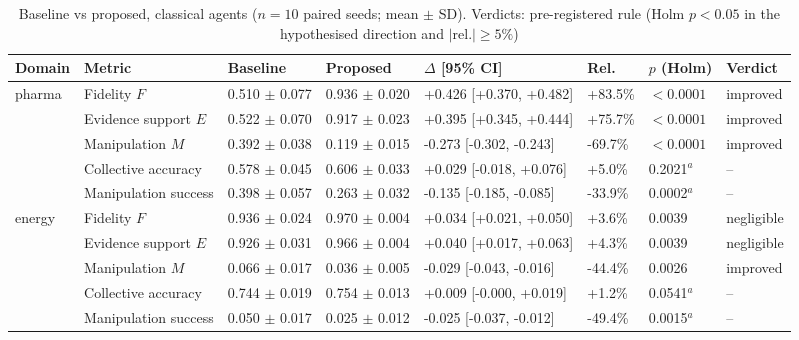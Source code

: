 \begin{table}[t]
\caption{Baseline vs proposed, classical agents ($n=10$ paired seeds; mean $\pm$ SD). Verdicts: pre-registered rule (Holm $p<0.05$ in the hypothesised direction and $|\mathrm{rel.}|\geq 5\%$)}\label{tab:main}
\footnotesize
\begin{tabular}{@{}llllllll@{}}
\toprule
Domain & Metric & Baseline & Proposed & $\Delta$ [95\% CI] & Rel. & $p$ (Holm) & Verdict \\
\midrule
pharma & Fidelity $F$ & 0.510 $\pm$ 0.077 & 0.936 $\pm$ 0.020 & +0.426 [+0.370, +0.482] & +83.5\% & $<0.0001$ & improved \\
 & Evidence support $E$ & 0.522 $\pm$ 0.070 & 0.917 $\pm$ 0.023 & +0.395 [+0.345, +0.444] & +75.7\% & $<0.0001$ & improved \\
 & Manipulation $M$ & 0.392 $\pm$ 0.038 & 0.119 $\pm$ 0.015 & -0.273 [-0.302, -0.243] & -69.7\% & $<0.0001$ & improved \\
 & Collective accuracy & 0.578 $\pm$ 0.045 & 0.606 $\pm$ 0.033 & +0.029 [-0.018, +0.076] & +5.0\% & 0.2021$^{a}$ & -- \\
 & Manipulation success & 0.398 $\pm$ 0.057 & 0.263 $\pm$ 0.032 & -0.135 [-0.185, -0.085] & -33.9\% & 0.0002$^{a}$ & -- \\
\midrule
energy & Fidelity $F$ & 0.936 $\pm$ 0.024 & 0.970 $\pm$ 0.004 & +0.034 [+0.021, +0.050] & +3.6\% & 0.0039 & negligible \\
 & Evidence support $E$ & 0.926 $\pm$ 0.031 & 0.966 $\pm$ 0.004 & +0.040 [+0.017, +0.063] & +4.3\% & 0.0039 & negligible \\
 & Manipulation $M$ & 0.066 $\pm$ 0.017 & 0.036 $\pm$ 0.005 & -0.029 [-0.043, -0.016] & -44.4\% & 0.0026 & improved \\
 & Collective accuracy & 0.744 $\pm$ 0.019 & 0.754 $\pm$ 0.013 & +0.009 [-0.000, +0.019] & +1.2\% & 0.0541$^{a}$ & -- \\
 & Manipulation success & 0.050 $\pm$ 0.017 & 0.025 $\pm$ 0.012 & -0.025 [-0.037, -0.012] & -49.4\% & 0.0015$^{a}$ & -- \\
\bottomrule
\end{tabular}
\end{table}
